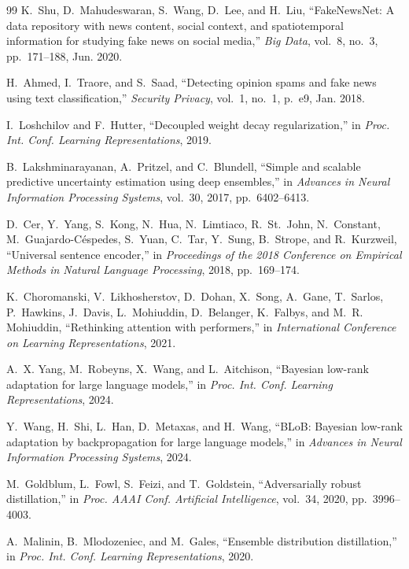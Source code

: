 \documentclass[12pt,a4paper]{article}
\theoremstyle{definition}
\begin{document}
\begin{thebibliography}{99}
K.~Shu, D.~Mahudeswaran, S.~Wang, D.~Lee, and H.~Liu, ``FakeNewsNet: A data repository with news content, social context, and spatiotemporal information for studying fake news on social media,'' \emph{Big Data}, vol.~8, no.~3, pp.~171--188, Jun. 2020.

H.~Ahmed, I.~Traore, and S.~Saad, ``Detecting opinion spams and fake news using text classification,'' \emph{Security Privacy}, vol.~1, no.~1, p.~e9, Jan. 2018.

I.~Loshchilov and F.~Hutter, ``Decoupled weight decay regularization,'' in \emph{Proc. Int. Conf. Learning Representations}, 2019.

B.~Lakshminarayanan, A.~Pritzel, and C.~Blundell, ``Simple and scalable predictive uncertainty estimation using deep ensembles,'' in \emph{Advances in Neural Information Processing Systems}, vol.~30, 2017, pp.~6402--6413.

D.~Cer, Y.~Yang, S.~Kong, N.~Hua, N.~Limtiaco, R.~St.~John, N.~Constant, M.~Guajardo-Céspedes, S.~Yuan, C.~Tar, Y.~Sung, B.~Strope, and R.~Kurzweil, ``Universal sentence encoder,'' in \emph{Proceedings of the 2018 Conference on Empirical Methods in Natural Language Processing}, 2018, pp.~169--174.

K.~Choromanski, V.~Likhosherstov, D.~Dohan, X.~Song, A.~Gane, T.~Sarlos, P.~Hawkins, J.~Davis, L.~Mohiuddin, D.~Belanger, K.~Falbys, and M.~R. Mohiuddin, ``Rethinking attention with performers,'' in \emph{International Conference on Learning Representations}, 2021.

A.~X. Yang, M.~Robeyns, X.~Wang, and L.~Aitchison, ``Bayesian low-rank adaptation for large language models,'' in \emph{Proc. Int. Conf. Learning Representations}, 2024.

Y.~Wang, H.~Shi, L.~Han, D.~Metaxas, and H.~Wang, ``BLoB: Bayesian low-rank adaptation by backpropagation for large language models,'' in \emph{Advances in Neural Information Processing Systems}, 2024.

M.~Goldblum, L.~Fowl, S.~Feizi, and T.~Goldstein, ``Adversarially robust distillation,'' in \emph{Proc. AAAI Conf. Artificial Intelligence}, vol.~34, 2020, pp.~3996--4003.

A.~Malinin, B.~Mlodozeniec, and M.~Gales, ``Ensemble distribution distillation,'' in \emph{Proc. Int. Conf. Learning Representations}, 2020.


\end{thebibliography}
\end{document}
